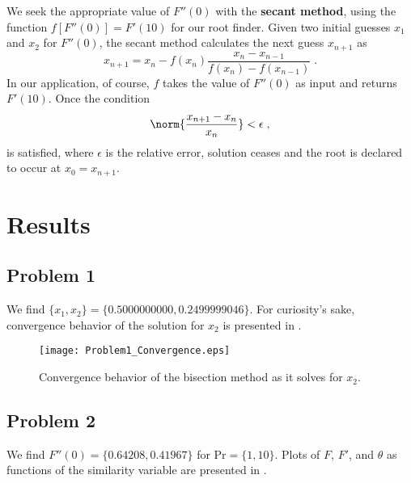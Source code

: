 \documentclass[12pt]{article}
\begin{document}
We seek the appropriate value of $F''(0)$ with the \textbf{secant method}, using the function $f[F''(0)] = F'(10)$ for our root finder. Given two initial guesses $x_1$ and $x_2$ for $F''(0)$, the secant method calculates the next guess $x_{n+1}$ as
\begin{equation}
x_{n+1} = x_n - f(x_n) \frac{x_n - x_{n-1}}{f(x_n) - f(x_{n-1})}
\;.
\label{eq:secant}
\end{equation}
In our application, of course, $f$ takes the value of $F''(0)$ as input and returns $F'(10)$. Once the condition
\begin{equation}
\norm{\frac{x_{n+1} - x_n}{x_n}} < \epsilon
\;,
\label{eq:secant_relerr}
\end{equation}
is satisfied, where $\epsilon$ is the relative error, solution ceases and the root is declared to occur at $x_0 = x_{n+1}$.

\section{Results} %

\subsection{Problem 1}

We find $\{ x_1, x_2 \} = \{ 0.5000000000, 0.2499999046 \}$. For curiosity's sake, convergence behavior of the solution for $x_2$ is presented in .

\begin{figure}[h!]
\begin{center}
\texttt{[image: Problem1\_Convergence.eps]}
\\
\caption{Convergence behavior of the bisection method as it solves for $x_2$.}
\label{fig:prob1_convergence}
\end{center}
\end{figure}

\subsection{Problem 2}

We find $F''(0) = \{0.64208, 0.41967\}$ for $\text{Pr} = \{1, 10\}$. Plots of $F$, $F'$, and $\theta$ as functions of the similarity variable are presented in .
\end{document}
